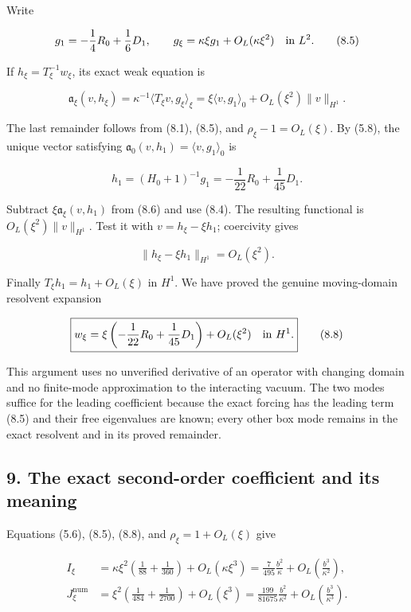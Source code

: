 Write

\[
g_1=-\frac14R_0+\frac16D_1,
\qquad g_\xi=\kappa\xi g_1+O_L(\kappa\xi^2)
\quad\hbox{in }L^2.
\tag{8.5}
\]

If \(h_\xi=T_\xi^{-1}w_\xi\), its exact weak equation is

\[
\mathfrak a_\xi(v,h_\xi)
=\kappa^{-1}\langle T_\xi v,g_\xi\rangle_\xi
=\xi\langle v,g_1\rangle_0
 +O_L(\xi^2)\|v\|_{H^1}.
\tag{8.6}
\]

The last remainder follows from (8.1), (8.5), and
\(\rho_\xi-1=O_L(\xi)\). By (5.8), the unique vector satisfying
\(\mathfrak a_0(v,h_1)=\langle v,g_1\rangle_0\) is

\[
h_1=(H_0+1)^{-1}g_1
=-\frac1{22}R_0+\frac1{45}D_1.
\tag{8.7}
\]

Subtract \(\xi\mathfrak a_\xi(v,h_1)\) from (8.6) and use (8.4). The
resulting functional is \(O_L(\xi^2)\|v\|_{H^1}\). Test it with
\(v=h_\xi-\xi h_1\); coercivity gives

\[
\|h_\xi-\xi h_1\|_{H^1}=O_L(\xi^2).
\]

Finally \(T_\xi h_1=h_1+O_L(\xi)\) in \(H^1\). We have proved the
genuine moving-domain resolvent expansion

\[
\boxed{w_\xi=\xi\left(-\frac1{22}R_0+\frac1{45}D_1\right)
 +O_L(\xi^2)\quad\hbox{in }H^1.}
\tag{8.8}
\]

This argument uses no unverified derivative of an operator with changing
domain and no finite-mode approximation to the interacting vacuum. The
two modes suffice for the leading coefficient because the exact forcing
has the leading term (8.5) and their free eigenvalues are known; every
other box mode remains in the exact resolvent and in its proved
remainder.

\subsection{9. The exact second-order coefficient and its
meaning}\label{bulk-the-exact-second-order-coefficient-and-its-meaning}

Equations (5.6), (8.5), (8.8), and \(\rho_\xi=1+O_L(\xi)\) give

\[
\begin{split}
I_\xi
&=\kappa\xi^2\left(\frac1{88}+\frac1{360}\right)
 +O_L(\kappa\xi^3)
=\frac7{495}\frac{b^2}{\kappa}
 +O_L\!\left(\frac{b^3}{\kappa^2}\right),\\
J_\xi^{\mathrm{num}}
&=\xi^2\left(\frac1{484}+\frac1{2700}\right)+O_L(\xi^3)
=\frac{199}{81675}\frac{b^2}{\kappa^2}
 +O_L\!\left(\frac{b^3}{\kappa^3}\right).
\end{split}
\tag{9.1}
\]

